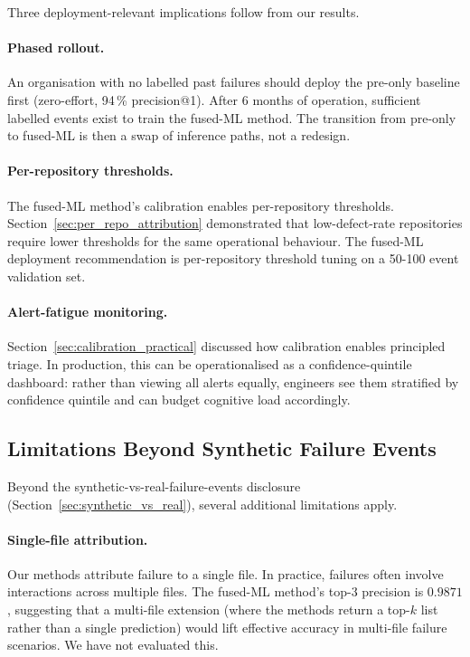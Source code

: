 \documentclass[11pt,a4paper]{article}
\begin{document}
Three deployment-relevant implications follow from our results.

\paragraph{Phased rollout.} An organisation with no labelled past failures should deploy the pre-only baseline first (zero-effort, 94\,\% precision@1). After 6 months of operation, sufficient labelled events exist to train the fused-ML method. The transition from pre-only to fused-ML is then a swap of inference paths, not a redesign.

\paragraph{Per-repository thresholds.} The fused-ML method's calibration enables per-repository thresholds. Section~\ref{sec:per_repo_attribution} demonstrated that low-defect-rate repositories require lower thresholds for the same operational behaviour. The fused-ML deployment recommendation is per-repository threshold tuning on a 50-100 event validation set.

\paragraph{Alert-fatigue monitoring.} Section~\ref{sec:calibration_practical} discussed how calibration enables principled triage. In production, this can be operationalised as a confidence-quintile dashboard: rather than viewing all alerts equally, engineers see them stratified by confidence quintile and can budget cognitive load accordingly.

\subsection{Limitations Beyond Synthetic Failure Events}
\label{sec:limitations_f}

Beyond the synthetic-vs-real-failure-events disclosure (Section~\ref{sec:synthetic_vs_real}), several additional limitations apply.

\paragraph{Single-file attribution.} Our methods attribute failure to a single file. In practice, failures often involve interactions across multiple files. The fused-ML method's top-3 precision is $0.9871$, suggesting that a multi-file extension (where the methods return a top-$k$ list rather than a single prediction) would lift effective accuracy in multi-file failure scenarios. We have not evaluated this.
\end{document}
